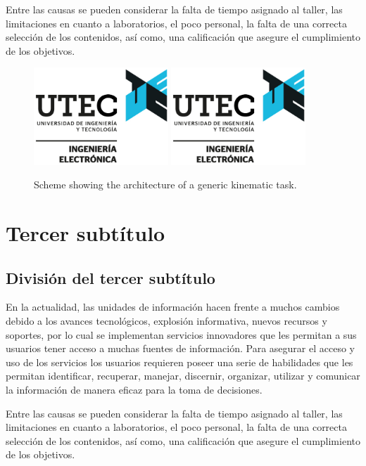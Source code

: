 Entre las causas se pueden considerar la falta de tiempo asignado al taller,
las limitaciones en cuanto a laboratorios, el poco personal, la falta de una
correcta selección de los contenidos, así como, una calificación que asegure el
cumplimiento de los objetivos.

\begin{figure}%
  \centering
  \includegraphics[width=0.45\textwidth]{images/ELECTRONICA}
  \includegraphics[width=0.45\textwidth]{images/ELECTRONICA}
  \captionsetup{font=footnotesize}
  \caption{Scheme showing the architecture of a generic kinematic task.}
  \label{fig:diagram2}
\end{figure}



\section{Tercer subtítulo}

\subsection{División del tercer subtítulo}

En la actualidad, las unidades de información hacen frente a muchos cambios
debido a los avances tecnológicos, explosión informativa, nuevos recursos y
soportes, por lo cual se implementan servicios innovadores que les permitan a
sus usuarios tener acceso a muchas fuentes de información. Para asegurar el
acceso y uso de los servicios los usuarios requieren poseer una serie de
habilidades que les permitan identificar, recuperar, manejar, discernir,
organizar, utilizar y comunicar la información de manera eficaz para la toma de
decisiones.

Entre las causas se pueden considerar la falta de tiempo asignado al taller,
las limitaciones en cuanto a laboratorios, el poco personal, la falta de una
correcta selección de los contenidos, así como, una calificación que asegure el
cumplimiento de los objetivos.

